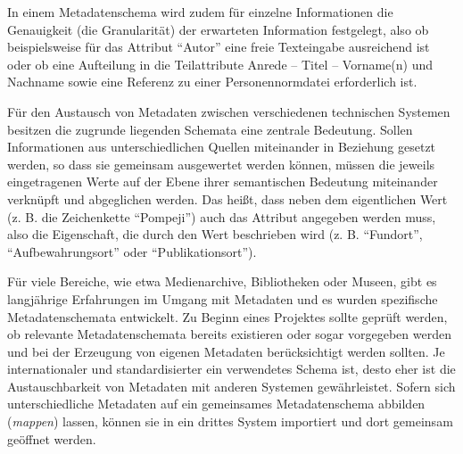 In einem Metadatenschema wird zudem für einzelne Informationen die Genauigkeit (die Granularität) der erwarteten Information festgelegt, also ob beispielsweise für das Attribut "`Autor"' eine freie Texteingabe ausreichend ist oder ob eine Aufteilung in die Teilattribute Anrede -- Titel -- Vorname(n) und Nachname sowie eine Referenz zu einer Personennormdatei erforderlich ist.

Für den Austausch von Metadaten zwischen verschiedenen technischen Systemen besitzen die zugrunde liegenden Schemata eine zentrale Bedeutung. Sollen Informationen aus unterschiedlichen Quellen miteinander in Beziehung gesetzt werden, so dass sie gemeinsam ausgewertet werden können, müssen die jeweils eingetragenen Werte auf der Ebene ihrer semantischen Bedeutung miteinander verknüpft und abgeglichen werden. Das heißt, dass neben dem eigentlichen Wert (z. B. die Zeichenkette "`Pompeji"') auch das Attribut angegeben werden muss, also die Eigenschaft, die durch den Wert beschrieben wird (z. B. "`Fundort"', "`Aufbewahrungsort"' oder "`Publikationsort"'). 

Für viele Bereiche, wie etwa Medienarchive, Bibliotheken oder Museen, gibt es langjährige Erfahrungen im Umgang mit Metadaten und es wurden spezifische Metadatenschemata entwickelt. Zu Beginn eines Projektes sollte geprüft werden, ob relevante Metadatenschemata bereits existieren oder sogar vorgegeben werden und bei der Erzeugung von eigenen Metadaten berücksichtigt werden sollten. Je internationaler und standardisierter ein verwendetes Schema ist, desto eher ist die Austauschbarkeit von Metadaten mit anderen Systemen gewährleistet. Sofern sich unterschiedliche Metadaten auf ein gemeinsames Metadatenschema abbilden (\emph{mappen}) lassen, können sie in ein drittes System importiert und dort gemeinsam geöffnet werden.

